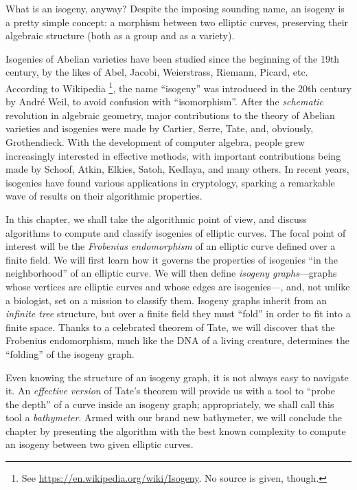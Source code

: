 \documentclass{report}
\theoremstyle{plain}
\theoremstyle{definition}
\begin{document}
What is an isogeny, anyway? %
Despite the imposing sounding name, an isogeny is a pretty simple
concept: a morphism between two elliptic curves, preserving their
algebraic structure (both as a group and as a variety). %

Isogenies of Abelian varieties have been studied since the beginning
of the 19th century, by the likes of Abel, Jacobi, Weierstrass,
Riemann, Picard, etc. %
According to Wikipedia%
\footnote{See \url{https://en.wikipedia.org/wiki/Isogeny}. No source
  is given, though.}, %
the name ``isogeny'' was introduced in the 20th century by André Weil,
to avoid confusion with ``isomorphism''. %
After the \emph{schematic} revolution in algebraic geometry, major
contributions to the theory of Abelian varieties and isogenies were
made by Cartier, Serre, Tate, and, obviously, Grothendieck. %
With the development of computer algebra, people grew increasingly
interested in effective methods, with important contributions being
made by Schoof, Atkin, Elkies, Satoh, Kedlaya, and many others. %
In recent years, isogenies have found various applications in
cryptology, sparking a remarkable wave of results on their algorithmic
properties. %

In this chapter, we shall take the algorithmic point of view, and
discuss algorithms to compute and classify isogenies of elliptic
curves. %
The focal point of interest will be the \emph{Frobenius endomorphism}
of an elliptic curve defined over a finite field. %
We will first learn how it governs the properties of isogenies ``in
the neighborhood'' of an elliptic curve. %
We will then define \emph{isogeny graphs}---graphs whose vertices are
elliptic curves and whose edges are isogenies---, and, not unlike a
biologist, set on a mission to classify them. %
Isogeny graphs inherit from an \emph{infinite tree} structure, but
over a finite field they must ``fold'' in order to fit into a finite
space. %
Thanks to a celebrated theorem of Tate, we will discover that the
Frobenius endomorphism, much like the DNA of a living creature,
determines the ``folding'' of the isogeny graph. %

Even knowing the structure of an isogeny graph, it is not always easy
to navigate it. %
An \emph{effective version} of Tate's theorem will provide us with a
tool to ``probe the depth'' of a curve inside an isogeny graph;
appropriately, we shall call this tool a \emph{bathymeter}. %
Armed with our brand new bathymeter, we will conclude the chapter by
presenting the algorithm with the best known complexity to compute an
isogeny between two given elliptic curves. %
\end{document}
